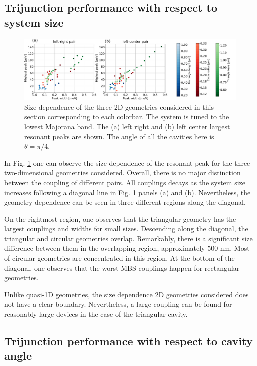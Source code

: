\subsection{Trijunction performance with respect to system size}

\begin{figure}[h!]
\centering
  \includegraphics[width=\linewidth]{figures/couplings_2d.pdf}
  \caption{Size dependence of the three 2D geometries considered in this section corresponding to each colorbar. The system is tuned to the lowest Majorana band. The (a) left right and (b) left center largest resonant peaks are shown. The angle of all the cavities here is $\theta=\pi/4$.}
  \label{fig:2d_size_results}
\end{figure}

In Fig. \ref{fig:2d_size_results} one can observe the size dependence of the resonant peak for the three two-dimensional geometries considered.
Overall, there is no major distinction between the coupling of different pairs.
All couplings decays as the system size increases following a diagonal line in Fig. \ref{fig:2d_size_results} panels (a) and (b).
Nevertheless, the geometry dependence can be seen in three different regions along the diagonal.

On the rightmost region, one observes that the triangular geometry has the largest couplings and widths for small sizes.
Descending along the diagonal, the triangular and circular geometries overlap.
Remarkably, there is a significant size difference between them in the overlapping region, approximately $500$ nm.
Most of circular geometries are concentrated in this region.
At the bottom of the diagonal, one observes that the worst MBS couplings happen for rectangular geometries.

Unlike quasi-1D geometries, the size dependence 2D geometries considered does not have a clear boundary.
Nevertheless, a large coupling can be found for reasonably large devices in the case of the triangular cavity.

\subsection{Trijunction performance with respect to cavity angle}

